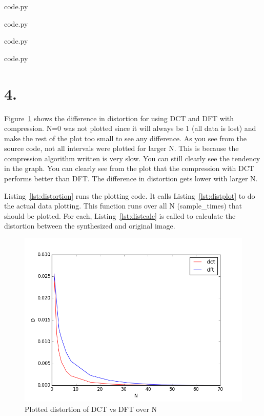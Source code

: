 
  {code.py}


  {code.py}


  {code.py}


  {code.py}

\section*{4.}
Figure~\ref{fig:distortion} shows the difference in distortion for using DCT and DFT with compression.
N=0 was not plotted since it will always be 1 (all data is lost) and make the rest of the plot too small to see any difference.
As you see from the source code, not all intervals were plotted for larger N.
This is because the compression algorithm written is very slow.
You can still clearly see the tendency in the graph.
You can clearly see from the plot that the compression with DCT performs better than DFT.
The difference in distortion gets lower with larger N.

Listing~\ref{lst:distortion} runs the plotting code.
It calls Listing~\ref{lst:distplot} to do the actual data plotting.
This function runs over all N (sample\_times) that should be plotted.
For each, Listing~\ref{lst:distcalc} is called to calculate the distortion between the synthesized and original image.

\begin{figure}[H]
  \includegraphics[width=\textwidth]{distortion}
  \caption{Plotted distortion of DCT vs DFT over N}
  \label{fig:distortion}
\end{figure}

